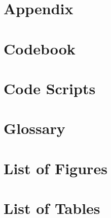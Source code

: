 \documentclass[hidelinks, 12pt]{article}
\begin{document}

%
\tableofcontents
\newpage



\newpage
\printbibliography


\newpage
\appendix
{}
\section*{Appendix}

\newpage


\newpage
\section{Codebook}
\label{appendix:codebook}


\newpage
\section{Code Scripts}
\label{appendix:code-scripts}


\newpage
\section{Glossary}
\label{appendix:glossary}


\newpage
\section{List of Figures}
\listoffigures

\newpage
\section{List of Tables}
\listoftables
\end{document}
